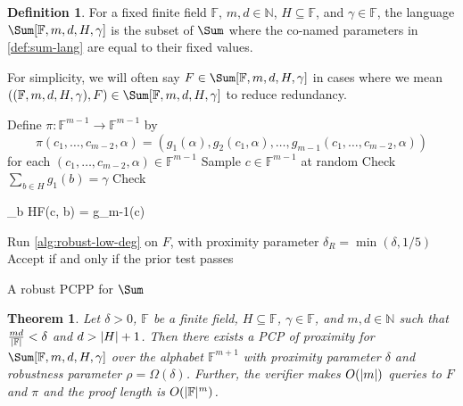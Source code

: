 \documentclass[english,12pt]{reedthesis}
\theoremstyle{plain}
\newtheorem{thm}{Theorem}[section]
\theoremstyle{definition}
\newtheorem{defn}[defn]{Definition}
\theoremstyle{remark}
\DeclarePairedDelimiter{\abs}{\lvert}{\rvert}
\begin{document}
\begin{defn}\label{def:sum-params}
  For a fixed finite field $\mathbb{F}$, $m, d \in \mathbb{N}$, $H \subseteq \mathbb{F}$, and
  $\gamma \in \mathbb{F}$, the language $\Sum[\mathbb{F}, m, d, H, \gamma]$ is the subset of
  $\Sum$ where the co-named parameters in \cref{def:sum-lang} are equal to their
  fixed values.
\end{defn}

For simplicity, we will often say $F \in \Sum[\mathbb{F}, m, d, H, \gamma]$ in cases
where we mean $((\mathbb{F}, m, d, H, \gamma), F) \in \Sum[\mathbb{F}, m, d, H, \gamma]$ to
reduce redundancy.

\begin{algorithm}[htbp]
  Define $\pi\colon \mathbb{F}^{m-1} \rightarrow \mathbb{F}^{m-1}$ by
  \[
    \pi(c_{1}, \ldots, c_{m-2}, \alpha) = (g_{1}(\alpha), g_{2}(c_{1}, \alpha), \ldots, g_{m-1}(c_{1}, \ldots, c_{m-2}, \alpha))
  \]
  for each $(c_{1}, \ldots, c_{m-2}, \alpha) \in \mathbb{F}^{m-1}$\;
  \KwRet{$\pi$}\;
  Sample $c \in \mathbb{F}^{m-1}$ at random\;
  Check $\sum_{b \in H}g_{1}(b) = \gamma$\;
  Check
  \begin{algomathdisplay}
    \sum_{b \in H}F(c, b) = g_{m-1}(c)
  \end{algomathdisplay}
  Run \cref{alg:robust-low-deg} on $F$, with proximity parameter
  $\delta_{R} = \min(\delta, 1/5)$\;
  Accept if and only if the prior test passes\;
  \caption{A robust PCPP for $\Sum$~\cite[Construction 4.3]{GOS25}}\label{alg:sum-pcpp}
\end{algorithm}

\begin{thm}\label{thm:pcpp-sum}
  Let $\delta > 0$, $\mathbb{F}$ be a finite field, $H \subseteq \mathbb{F}$,
  $\gamma \in \mathbb{F}$, and $m, d \in \mathbb{N}$ such that $\frac{md}{\abs{\mathbb{F}}} < \delta$
  and $d > \abs{H} + 1$. Then there exists a PCP of
  proximity for $\Sum[\mathbb{F}, m, d, H, \gamma]$ over the alphabet
  $\mathbb{F}^{m+1}$ with proximity parameter $\delta$ and robustness parameter
  $\rho = \Omega(\delta)$. Further, the verifier makes $O(\abs{m})$ queries to $F$ and $\pi$
  and the proof length is $O(\abs{\mathbb{F}}^{m})$.
\end{thm}
\end{document}
